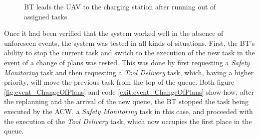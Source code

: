\begin{figure}[htbp]
    \centering
    \hfill
    \hfill
    \caption{\gls{BT} leads the \gls{UAV} to the charging station after running out of assigned tasks}
    \label{fig:chargeBecouseIdle}
\end{figure}

Once it had been verified that the system worked well in the absence of unforeseen events, the system was tested in all kinds of situations. First, the \gls{BT}'s ability to stop the current task and switch to the execution of the new task in the event of a change of plans was tested. This was done by first requesting a \emph{Safety Monitoring} task and then requesting a \emph{Tool Delivery} task, which, having a higher priority, will move the previous task from the top of the queue. Both figure \ref{fig:event_ChangeOfPlans} and code \ref{exit:event_ChangeOfPlans} show how, after the replanning and the arrival of the new queue, the \gls{BT} stopped the task being executed by the \gls{ACW}, a \emph{Safety Monitoring} task in this case, and proceeded with the execution of the \emph{Tool Delivery} task, which now occupies the first place in the queue.

